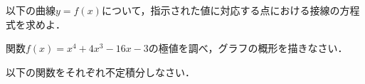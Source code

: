 \begin{questions}

	\newpage
	\question
	以下の曲線$y = f(x)$について，指示された値に対応する点における接線の方程式を求めよ．
	\setlength\answerlinelength{1in}
	
	\newpage
	\question
	関数$\displaystyle f(x) = x^4 + 4x^3 - 16x - 3$の極値を調べ，グラフの概形を描きなさい．
	
	\newpage
	\question
	\setlength\answerlinelength{3in}
	以下の関数をそれぞれ不定積分しなさい．
\end{questions}
